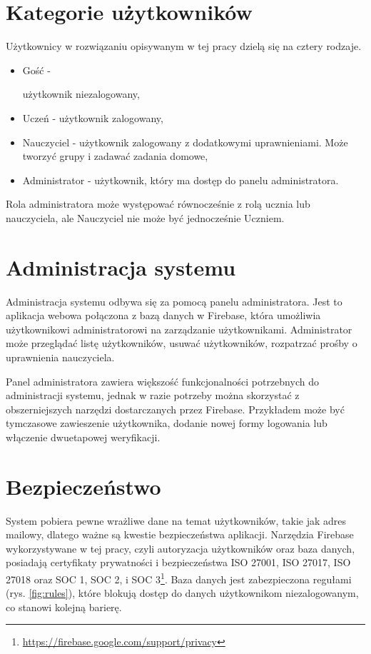 \documentclass[a4paper,twoside,12pt]{book}
\newcommand{\ksremark}[1]{%
{%
{\color{brickred}{[#1]}}}%
\addcontentsline{rks}{uwagas}{\protect{#1}}%
}
\begin{document}
\section{Kategorie użytkowników}

Użytkownicy w rozwiązaniu opisywanym w tej pracy dzielą się na cztery rodzaje. 
\begin{itemize}
\item Gość - \ksremark{pauza `--', nie dywiz, myślnik `-'} użytkownik niezalogowany,
\item Uczeń - użytkownik zalogowany,
\item Nauczyciel - użytkownik zalogowany z dodatkowymi uprawnieniami. Może tworzyć grupy i zadawać zadania domowe,
\item Administrator - użytkownik, który ma dostęp do panelu administratora.
\end{itemize}
Rola administratora może występować równocześnie z rolą ucznia lub nauczyciela, ale Nauczyciel nie może być jednocześnie Uczniem.


\section{Administracja systemu}

Administracja systemu odbywa się za pomocą panelu administratora. Jest to aplikacja webowa połączona z bazą danych w Firebase, która umożliwia użytkownikowi  administratorowi na zarządzanie użytkownikami. Administrator może przeglądać listę użytkowników, usuwać użytkowników, rozpatrzać prośby o uprawnienia nauczyciela. 

Panel administratora zawiera większość funkcjonalności potrzebnych do administracji systemu, jednak w razie potrzeby można skorzystać z obszerniejszych narzędzi dostarczanych przez Firebase. Przykładem może być tymczasowe zawieszenie użytkownika, dodanie nowej formy logowania lub włączenie dwuetapowej weryfikacji.

\section{Bezpieczeństwo}

System pobiera pewne wrażliwe dane na temat użytkowników, takie jak adres mailowy, dlatego ważne są kwestie bezpieczeństwa aplikacji. Narzędzia Firebase wykorzystywane w tej pracy, czyli autoryzacja użytkowników oraz baza danych, posiadają certyfikaty prywatności i bezpieczeństwa ISO 27001, ISO 27017, ISO 27018 oraz SOC 1, SOC 2, i SOC 3\footnote{\url{https://firebase.google.com/support/privacy}}. 
Baza danych jest zabezpieczona regułami (rys. \ref{fig:rules}), które blokują dostęp do danych użytkownikom niezalogowanym, co stanowi kolejną barierę.
\end{document}
